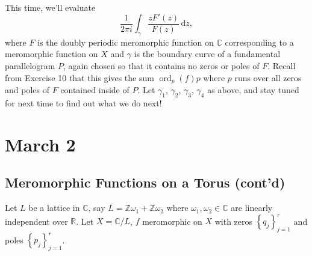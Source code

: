 \documentclass[12pt]{article}
\newcommand{\z}{\mathbb{Z}}
\newcommand{\cx}{\mathbb{C}}
\newcommand{\real}{\mathbb{R}}
\newcommand\setb[1]{\left \{ #1 \right \}}
\theoremstyle{definition}
\theoremstyle{remark}
\DeclareMathOperator\ord{ord}
\begin{document}
This time, we'll evaluate 
\begin{equation}
    \frac{1}{2 \pi i} \int_{\gamma} \frac{z F'(z)}{F(z)} \, \mathrm{d}z,
\end{equation}
where $F$ is the doubly periodic meromorphic function on $\cx$ corresponding to a meromorphic function on $X$ and $\gamma$ is the boundary curve of a fundamental parallelogram $P$, again chosen so that it contains no zeros or poles of $F$. Recall from Exercise 10 that this gives the sum $\ord_p(f) p$ where $p$ runs over all zeros and poles of $F$ contained inside of $P$. Let $\gamma_1$, $\gamma_2$, $\gamma_3$, $\gamma_4$ as above, and stay tuned for next time to find out what we do next!
\section{March 2}
\subsection{Meromorphic Functions on a Torus (cont'd)}
Let $L$ be a lattice in $\cx$, say $L = \z \omega_1 +  \z \omega_2$ where $\omega_1 , \omega_2 \in \cx$ are linearly independent over $\real$. Let $X = \cx / L$, $f$ meromorphic on $X$ with zeros $\setb{q_j}_{j=1}^r$ and poles $\setb{p_j}_{j=1}^r$.
\end{document}
